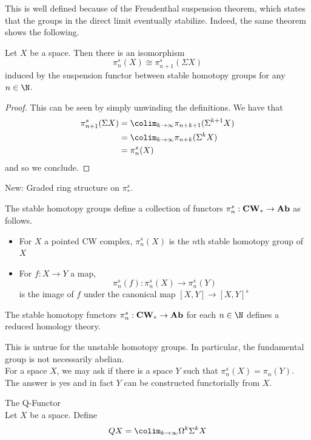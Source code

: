 \documentclass[a4paper]{article}
\begin{document}
This is well defined because of the Freudenthal suspension theorem, which states that the groups in the direct limit eventually stabilize. Indeed, the same theorem shows the following. 

\begin{prp}{}{} Let $X$ be a space. Then there is an isomorphism $$\pi_n^s(X)\cong\pi_{n+1}^s(\Sigma X)$$ induced by the suspension functor between stable homotopy groups for any $n\in\N$. 
\begin{proof}
This can be seen by simply unwinding the definitions. We have that 
\begin{align*}
\pi_{n+1}^s(\Sigma X)&=\colim_{k\to\infty}\pi_{n+k+1}(\Sigma^{k+1}X)\\
&=\colim_{k\to\infty}\pi_{n+k}(\Sigma^kX)\\
&=\pi_n^s(X)
\end{align*}
and so we conclude. 
\end{proof}
\end{prp}

New: Graded ring structure on $\pi_\ast^s$. \\

\begin{thm}{}{} The stable homotopy groups define a collection of functors $\pi_n^s:\bold{CW}_\ast\to\bold{Ab}$ as follows. 
\begin{itemize}
\item For $X$ a pointed CW complex, $\pi_n^s(X)$ is the $n$th stable homotopy group of $X$
\item For $f:X\to Y$ a map, $$\pi_n^s(f):\pi_n^s(X)\to\pi_n^s(Y)$$ is the image of $f$ under the canonical map $[X,Y]\to[X,Y]^s$
\end{itemize}
\end{thm}

\begin{thm}{}{} The stable homotopy functors $\pi_n^s:\bold{CW}_\ast\to\bold{Ab}$ for each $n\in\N$ defines a reduced homology theory. 
\end{thm}

This is untrue for the unstable homotopy groups. In particular, the fundamental group is not necessarily abelian. \\

For a space $X$, we may ask if there is a space $Y$ such that $\pi_n^s(X)=\pi_n(Y)$. The answer is yes and in fact $Y$ can be constructed functorially from $X$. 

\begin{defn}{The Q-Functor}{}\\
Let $X$ be a space. Define $$QX=\colim_{k\to\infty}\Omega^k\Sigma^k X$$
\end{defn}
\end{document}
